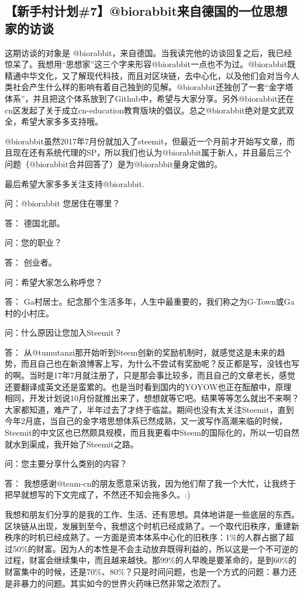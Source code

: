 \documentclass[]{ctexbook}
\begin{document}
\hypertarget{7biorabbit}{%
\subsection{【新手村计划\#7】@biorabbit来自德国的一位思想家的访谈}\label{7biorabbit}}

这期访谈的对象是 @biorabbit，来自德国。当我读完他的访谈回复之后，我已经惊呆了。我想用``思想家''这三个字来形容@biorabbit一点也不为过。@biorabbit既精通中华文化，又了解现代科技，而且对区块链，去中心化，以及他们会对当今人类社会产生什么样的影响有着自己独到的见解。@biorabbit还独创了一套``金字塔体系''，并且把这个体系放到了Github中，希望与大家分享。另外@biorabbit还在cn区发起了关于成立cn-education教育版块的倡议。总之@biorabbit绝对是文武双全，希望大家多多支持哦。

@biorabbit虽然2017年7月份就加入了steemit，但最近一个月前才开始写文章，而且现在还有系统代理的SP，所以我们也认为@biorabbit属于新人，并且最后三个问题（@biorabbit合并回答了）是为@biorabbit量身定做的。

最后希望大家多多关注支持@biorabbit.

问：@biorabbit 您居住在哪里？

答： 德国北部。

问：您的职业？

答： 创业者。

问：希望大家怎么称呼您？

答： Ga村居士。纪念那个生活多年，人生中最重要的，我们称之为G-Town或Ga村的小村庄。

问：什么原因让您加入Steemit？

答： 从@tumutanzi那开始听到Steem创新的奖励机制时，就感觉这是未来的趋势，而且自己也在新浪博客上写，为什么不尝试有奖励呢？反正都是写，没钱也写的啊。当时是17年7月就注册了，只是那会事比较多，而且自己的文章老长，感觉还要翻译成英文还是蛮累的。也是当时看到国内的YOYOW也正在酝酿中，原理相同，开发计划说10月份就推出来了，想想就等它吧。结果等等怎么就出不来啊？大家都知道，难产了，半年过去了才终于临盆。期间也没有太关注Steemit，直到今年2月底，当自己的金字塔思想体系已然成熟，又一波写作高潮来临的时候，Steemit的中文区也已然颇具规模，而且我更看中Steem的国际化的，所以一切自然就水到渠成，我开始了Steemit之路。

问：您主要分享什么类别的内容？

答： 我想感谢@team-cn的朋友愿意采访我，因为他们帮了我一个大忙，让我终于把早就想写的下文完成了，不然还不知会拖多久。:)

我想和朋友们分享的是我的工作、生活、还有思想。具体地讲是一些底层的东西。区块链从出现，发展到至今，我想这个时机已经成熟了。一个取代旧秩序，重建新秩序的时机已经成熟了。一方面是资本体系中心化的旧秩序：1\%的人群占据了超过50\%的财富。因为人的本性是不会主动放弃既得利益的，所以这是一个不可逆的过程，财富会继续集中，而且越来越快。那99\%的人早晚是要革命的，是到60\%的财富集中的时候，还是70\%、80\%？只是时间问题，也是一个方式的问题：暴力还是非暴力的问题。其实如今的世界火药味已然非常之浓烈了。
\end{document}
